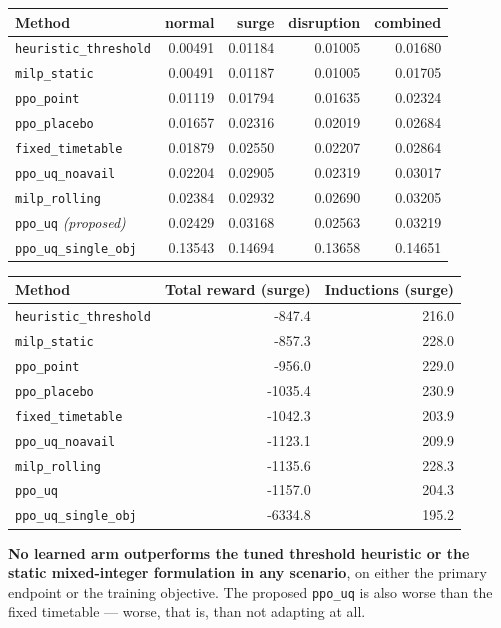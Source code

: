 \documentclass[
]{article}
\begin{document}
\begin{longtable}[]{@{}lrrrr@{}}
\toprule\noalign{}
Method & normal & surge & disruption & combined \\
\midrule\noalign{}
\endhead
\bottomrule\noalign{}
\endlastfoot
\texttt{heuristic\_threshold} & 0.00491 & 0.01184 & 0.01005 & 0.01680 \\
\texttt{milp\_static} & 0.00491 & 0.01187 & 0.01005 & 0.01705 \\
\texttt{ppo\_point} & 0.01119 & 0.01794 & 0.01635 & 0.02324 \\
\texttt{ppo\_placebo} & 0.01657 & 0.02316 & 0.02019 & 0.02684 \\
\texttt{fixed\_timetable} & 0.01879 & 0.02550 & 0.02207 & 0.02864 \\
\texttt{ppo\_uq\_noavail} & 0.02204 & 0.02905 & 0.02319 & 0.03017 \\
\texttt{milp\_rolling} & 0.02384 & 0.02932 & 0.02690 & 0.03205 \\
\texttt{ppo\_uq} \emph{(proposed)} & 0.02429 & 0.03168 & 0.02563 &
0.03219 \\
\texttt{ppo\_uq\_single\_obj} & 0.13543 & 0.14694 & 0.13658 & 0.14651 \\
\end{longtable}

\begin{longtable}[]{@{}lrr@{}}
\toprule\noalign{}
Method & Total reward (surge) & Inductions (surge) \\
\midrule\noalign{}
\endhead
\bottomrule\noalign{}
\endlastfoot
\texttt{heuristic\_threshold} & -847.4 & 216.0 \\
\texttt{milp\_static} & -857.3 & 228.0 \\
\texttt{ppo\_point} & -956.0 & 229.0 \\
\texttt{ppo\_placebo} & -1035.4 & 230.9 \\
\texttt{fixed\_timetable} & -1042.3 & 203.9 \\
\texttt{ppo\_uq\_noavail} & -1123.1 & 209.9 \\
\texttt{milp\_rolling} & -1135.6 & 228.3 \\
\texttt{ppo\_uq} & -1157.0 & 204.3 \\
\texttt{ppo\_uq\_single\_obj} & -6334.8 & 195.2 \\
\end{longtable}

\textbf{No learned arm outperforms the tuned threshold heuristic or the
static mixed-integer formulation in any scenario}, on either the primary
endpoint or the training objective. The proposed \texttt{ppo\_uq} is
also worse than the fixed timetable --- worse, that is, than not
adapting at all.
\end{document}
